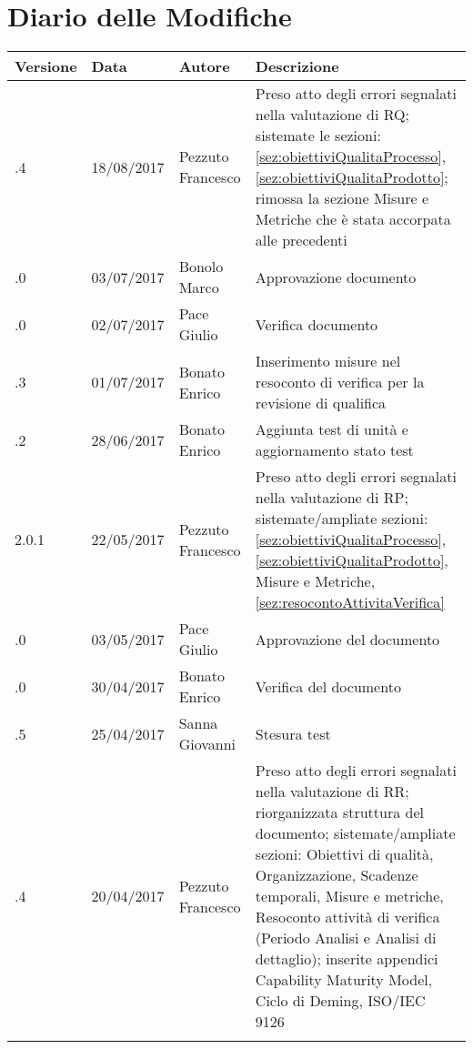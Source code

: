 \section*{Diario delle Modifiche}
\begin{longtabu} to \textwidth {
	X[4,l,p]
	X[4,l,p]
	X[4,l,p]
	X[8,l,p]}
	\toprule
		 Versione & Data & Autore & Descrizione \\
		\midrule
		\endhead
		
		\addlinespace[0.2em]
		\midrule
		.4 & 18/08/2017 & Pezzuto Francesco & Preso atto degli errori segnalati nella valutazione di RQ; sistemate le sezioni: \ref{sez:obiettiviQualitaProcesso}, \ref{sez:obiettiviQualitaProdotto}; rimossa la sezione Misure e Metriche che è stata accorpata alle precedenti\\
		\addlinespace[0.2em]
		\midrule
		.0 & 03/07/2017 & Bonolo Marco & Approvazione documento\\
		\addlinespace[0.2em]
		\midrule
		.0 & 02/07/2017 & Pace Giulio & Verifica documento\\
		\addlinespace[0.2em]
		\midrule
		.3 & 01/07/2017 & Bonato Enrico & Inserimento misure nel resoconto di verifica per la revisione di qualifica \\
		\addlinespace[0.2em]
		\midrule
		.2 & 28/06/2017 & Bonato Enrico & Aggiunta test di unità e aggiornamento stato test \\
		\addlinespace[0.2em]
		\midrule
		\addlinespace[0.2em]

		2.0.1 & 22/05/2017 & Pezzuto Francesco & Preso atto degli errori segnalati nella valutazione di RP; sistemate/ampliate sezioni: \ref{sez:obiettiviQualitaProcesso}, \ref{sez:obiettiviQualitaProdotto},  Misure e Metriche, \ref{sez:resocontoAttivitaVerifica}\\
		\addlinespace[0.2em]
		\midrule
		.0 & 03/05/2017 & Pace Giulio & Approvazione del documento\\
		\addlinespace[0.2em]
		\midrule
		.0 & 30/04/2017 & Bonato Enrico & Verifica del documento\\
		\addlinespace[0.2em]
		\midrule
		.5 & 25/04/2017 & Sanna Giovanni & Stesura test \\
		\addlinespace[0.2em]
		\midrule
		.4 & 20/04/2017 & Pezzuto Francesco & Preso atto degli errori segnalati nella valutazione di RR; riorganizzata struttura del documento; sistemate/ampliate sezioni: Obiettivi di qualità, Organizzazione, Scadenze temporali, Misure e metriche, Resoconto attività di verifica (Periodo Analisi e Analisi di dettaglio); inserite appendici Capability Maturity Model, Ciclo di Deming, ISO/IEC 9126\\
		\addlinespace[0.2em]
		\midrule
		\addlinespace[0.2em]
		
		
\end{longtabu}

